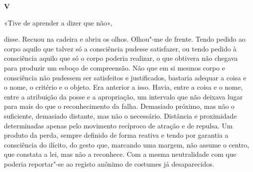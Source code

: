 \vspace*{1.8cm}
\noindent{}\textbf{V}

\bigskip

«Tive de aprender a dizer que não»,

disse. Recuou na cadeira e abriu os olhos. Olhou"-me de frente. Tendo
pedido ao corpo aquilo que talvez só a consciência pudesse satisfazer,
ou tendo pedido à consciência aquilo que só o corpo poderia realizar, o
que obtivera não chegava para produzir um esboço de compreensão. Não que
em si mesmos corpo e consciência não pudessem ser satisfeitos e
justificados, bastaria adequar a coisa e o nome, o critério e o objeto.
Era anterior a isso. Havia, entre a coisa e o nome, entre a atribuição
da posse e a apropriação, um intervalo que não deixava lugar para mais
do que o reconhecimento da falha. Demasiado próximo, mas não o
suficiente, demasiado distante, mas não o necessário. Distância e
proximidade determinadas apenas pelo movimento recíproco de atração e
de repulsa. Um produto da perda, sempre definido de forma reativa e
tendo por garantia a consciência do ilícito, do gesto que, marcando uma
margem, não assume o centro, que constata a lei, mas não a reconhece.
Com a mesma neutralidade com que poderia reportar"-se ao registo anônimo
de costumes já desaparecidos.


